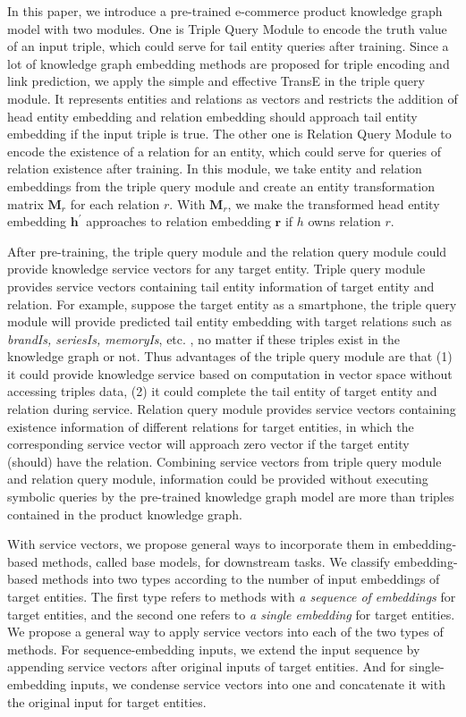 In this paper, we introduce a pre-trained e-commerce product knowledge graph model with two modules. One is Triple Query Module to encode the truth value of an input triple, which could serve for tail entity queries after training. Since a lot of knowledge graph embedding methods are proposed for triple encoding and link prediction, we apply the simple and effective TransE \cite{TransE-Bordes-2013} in the triple query module. It represents entities and relations as vectors and restricts the addition of head entity embedding and relation embedding should approach tail entity embedding if the input triple is true. The other one is Relation Query Module to encode the existence of a relation for an entity, which could serve for queries of relation existence after training. In this module, we take entity and relation embeddings from the triple query module and create an entity transformation matrix $\mathbf{M}_r$ for each relation $r$. With $\mathbf{M}_r$, we make the transformed head entity embedding $\mathbf{h}^\prime$ approaches to relation embedding $\mathbf{r}$ if $h$ owns relation $r$. 

After pre-training, the triple query module and the relation query module could provide knowledge service vectors for any target entity. Triple query module provides service vectors containing tail entity information of target entity and relation. For example, suppose the target entity as a smartphone, the triple query module will provide predicted tail entity embedding with target relations such as \emph{brandIs, seriesIs, memoryIs}, etc. , no matter if these triples exist in the knowledge graph or not. Thus advantages of the triple query module are that (1) it could provide knowledge service based on computation in vector space without accessing triples data, (2) it could complete the tail entity of target entity and relation during service. Relation query module provides service vectors containing existence information of different relations for target entities, in which the corresponding service vector will approach zero vector if the target entity (should) have the relation. Combining service vectors from triple query module and relation query module, information could be provided without executing symbolic queries by the pre-trained knowledge graph model are more than triples contained in the product knowledge graph. 
 
With service vectors, we propose general ways to incorporate them in embedding-based methods, called base models, for downstream tasks. We classify embedding-based methods into two types according to the number of input embeddings of target entities. The first type refers to methods with \emph{a sequence of embeddings} for target entities, and the second one refers to \emph{a single embedding} for target entities. We propose a general way to apply service vectors into each of the two types of methods. For sequence-embedding inputs, we extend the input sequence by appending service vectors after original inputs of target entities. And for single-embedding inputs, we condense service vectors into one and concatenate it with the original input for target entities. 

